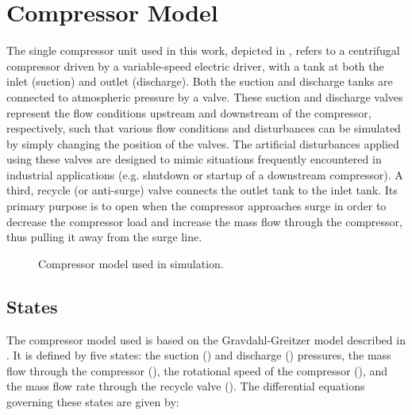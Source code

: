 \section{Compressor Model}
\label{sec:mod:comp}

The single compressor unit used in this work, depicted in , refers to a centrifugal compressor driven by a variable-speed electric driver, with a tank at both the inlet (suction) and outlet (discharge).
Both the suction and discharge tanks are connected to atmospheric pressure by a valve.
These suction and discharge valves represent the flow conditions upstream and downstream of the compressor, respectively, such that various flow conditions and disturbances can be simulated by simply changing the position of the valves.
The artificial disturbances applied using these valves are designed to mimic situations frequently encountered in industrial applications (e.g. shutdown or startup of a downstream compressor).
A third, recycle (or anti-surge) valve connects the outlet tank to the inlet tank. Its primary purpose is to open when the compressor approaches surge in order to decrease the compressor load and increase the mass flow through the compressor, thus pulling it away from the surge line.

\begin{figure}
  \centering
  \resizebox{0.8\linewidth}{!}{%
    \begin{tikzpicture}
      \drawcomp
    \end{tikzpicture}
  }
  \caption{Compressor model used in simulation.}
  \label{fig:mod:single-comp}
\end{figure}



\subsection{States}
The compressor model used is based on the Gravdahl-Greitzer model described in \cite{Gravdahl1999}. It is defined by five states: the suction () and discharge () pressures, the mass flow through the compressor (), the rotational speed of the compressor (), and the mass flow rate through the recycle valve ().
The differential equations governing these states are given by:


